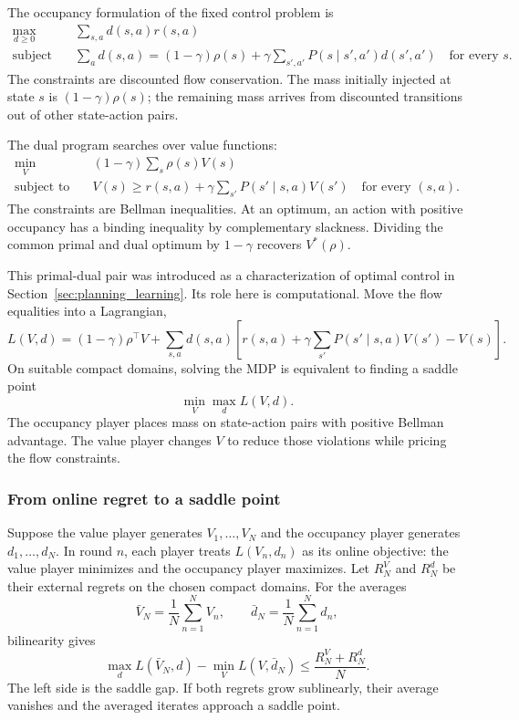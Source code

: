The occupancy formulation of the fixed control problem is
\begin{align}
\max_{d\geq0}\quad&
\sum_{s,a}d(s,a)r(s,a)
\label{eq:online_discounted_primal}\\
\text{subject to}\quad&
\sum_a d(s,a)
=
(1-\gamma)\rho(s)
+
\gamma\sum_{s',a'}
P(s\mid s',a')d(s',a')
\quad\text{for every }s.
\nonumber
\end{align}
The constraints are discounted flow conservation. The mass initially injected at state $s$ is $(1-\gamma)\rho(s)$; the remaining mass arrives from discounted transitions out of other state-action pairs.

The dual program searches over value functions:
\begin{align}
\min_V\quad&
(1-\gamma)\sum_s\rho(s)V(s)
\label{eq:online_discounted_dual}\\
\text{subject to}\quad&
V(s)
\geq
r(s,a)+\gamma\sum_{s'}P(s'\mid s,a)V(s')
\quad\text{for every }(s,a).
\nonumber
\end{align}
The constraints are Bellman inequalities. At an optimum, an action with positive occupancy has a binding inequality by complementary slackness. Dividing the common primal and dual optimum by $1-\gamma$ recovers $V^*(\rho)$.

This primal-dual pair was introduced as a characterization of optimal control in Section~\ref{sec:planning_learning}. Its role here is computational. Move the flow equalities into a Lagrangian,
\begin{equation}
L(V,d)
=
(1-\gamma)\rho^\top V
+
\sum_{s,a}d(s,a)
\left[
r(s,a)
+\gamma\sum_{s'}P(s'\mid s,a)V(s')
-V(s)
\right].
\label{eq:online_bellman_lagrangian}
\end{equation}
On suitable compact domains, solving the MDP is equivalent to finding a saddle point
\begin{equation}
\min_V\max_d L(V,d).
\label{eq:online_bellman_saddle}
\end{equation}
The occupancy player places mass on state-action pairs with positive Bellman advantage. The value player changes $V$ to reduce those violations while pricing the flow constraints.

\subsubsection{From online regret to a saddle point}

Suppose the value player generates $V_1,\ldots,V_N$ and the occupancy player generates $d_1,\ldots,d_N$. In round $n$, each player treats $L(V_n,d_n)$ as its online objective: the value player minimizes and the occupancy player maximizes. Let $R_N^V$ and $R_N^d$ be their external regrets on the chosen compact domains. For the averages
\[
\bar V_N=\frac1N\sum_{n=1}^NV_n,
\qquad
\bar d_N=\frac1N\sum_{n=1}^Nd_n,
\]
bilinearity gives
\begin{equation}
\max_dL(\bar V_N,d)
-
\min_VL(V,\bar d_N)
\leq
\frac{R_N^V+R_N^d}{N}.
\label{eq:online_saddle_regret}
\end{equation}
The left side is the saddle gap. If both regrets grow sublinearly, their average vanishes and the averaged iterates approach a saddle point.

